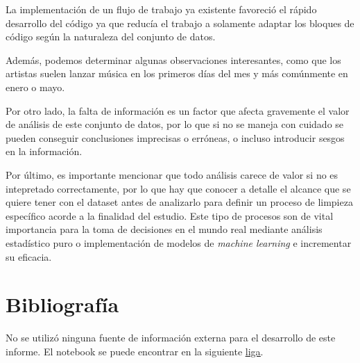 \documentclass{article}
\begin{document}
	La implementación de un flujo de trabajo ya existente favoreció el rápido desarrollo del código ya que reducía el trabajo a solamente adaptar los bloques de código según la naturaleza del conjunto de datos.
	
	Además, podemos determinar algunas observaciones interesantes, como que los artistas suelen lanzar música en los primeros días del mes y más comúnmente en enero o mayo.
	
	Por otro lado, la falta de información es un factor que afecta gravemente el valor de análisis de este conjunto de datos, por lo que si no se maneja con cuidado se pueden conseguir conclusiones imprecisas o erróneas, o incluso introducir sesgos en la información.
	
	Por último, es importante mencionar que todo análisis carece de valor si no es intepretado correctamente, por lo que hay que conocer a detalle el alcance que se quiere tener con el dataset antes de analizarlo para definir un proceso de limpieza específico acorde a la finalidad del estudio. Este tipo de procesos son de vital importancia para la toma de decisiones en el mundo real mediante análisis estadístico puro o implementación de modelos de \textit{machine learning} e incrementar su eficacia.
	
	\section{Bibliografía}
	No se utilizó ninguna fuente de información externa para el desarrollo de este informe. El notebook se puede encontrar en la siguiente \hyperlink{https://colab.research.google.com/drive/1gEqeVx9LOfKF7kmSRVEvj6D3_2fIOvWQ?usp=sharing}{\underline{liga}}.
\end{document}
